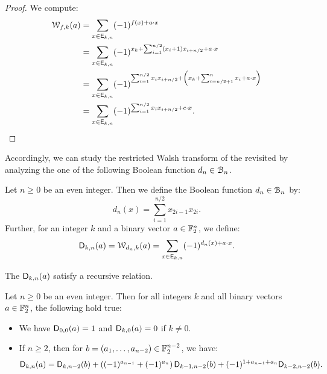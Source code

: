 \documentclass[11pt]{llncs}
\begin{document}
\begin{proof}
	We compute:
	\begin{align*}
		\wtk{f}{k}(a)&=\sum_{x \in \Ekn{k}{n}} (-1)^{f(x)+a \cdot x}\\
		&=\sum_{x \in \Ekn{k}{n}} (-1)^{x_k + \sum_{i=1}^{n/2} (x_i+1) x_{i+n/2}+ a \cdot x}\\
		&=\sum_{x \in \Ekn{k}{n}} (-1)^{\sum_{i=1}^{n/2} x_i x_{i+n/2}+\left(x_k+\sum_{i=n/2+1}^{n}x_i+a\cdot x\right)}\\
		&=\sum_{x \in \Ekn{k}{n}} (-1)^{\sum_{i=1}^{n/2} x_i x_{i+n/2}+ c \cdot x}.\qedhere
	\end{align*}
\end{proof}

Accordingly, we can study the restricted Walsh transform of the revisited \hwbf{} by analyzing the one of the following Boolean function $d_n\in\BN$.

\begin{definition}
	Let $n\geq 0$ be an even integer. Then we define the Boolean function $d_n\in\BN$ by:
	\[
		d_n(x)=\sum_{i=1}^{n/2}x_{2i-1}x_{2i}.
	\]
	Further, for an integer $k$ and a binary vector $a\in\F_2^n$, we define:
	\[
		\Dnka{n}{k}{a}=\wtk{d_n}{k}(a)=\sum_{x\in \Ekn{k}{n}} (-1)^{d_n(x) +a\cdot x}.
	\]
\end{definition}

The $\Dnka{n}{k}{a}$ satisfy a recursive relation.

\begin{proposition}\label{prop:recursiveDnka}
Let $n\geq 0$ be an even integer. Then for all integers $k$ and all binary vectors $a\in\F_2^n$, the following hold true:
	\begin{itemize}
		\item We have $\Dnka 00a=1$ and $\Dnka 0ka=0$ if $k\neq 0$.
		\item If $n\geq 2$, then for $b=(a_1,\dots,a_{n-2})\in\F_2^{n-2}$, we have:
		\[
			\Dnka{n}{k}{a}=\Dnka{n-2}{k}{b}+\left((-1)^{a_{n-1}} + (-1)^{a_{n}}\right)\Dnka{n-2}{k-1}{b} + (-1)^{1+a_{n-1}+a_n} \Dnka{n-2}{k-2}{b}.
		\]
	\end{itemize}
\end{proposition}
\end{document}
